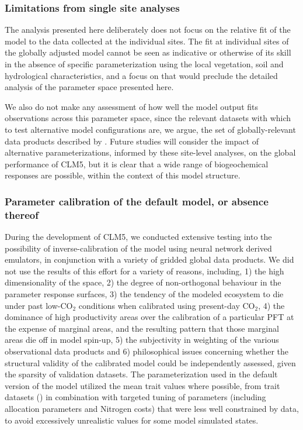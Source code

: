 \documentclass[draft,linenumbers]{agujournal}
\begin{document}
\subsubsection{Limitations from single site analyses}
The analysis presented here deliberately does not focus on the relative fit of the model to the data collected at the individual sites. The fit at individual sites of the globally adjusted model cannot be seen as indicative or otherwise of its skill in the absence of specific parameterization using the local vegetation, soil and hydrological characteristics, and a focus on that would preclude the detailed analysis of the parameter space presented here.  

We also do not make any assessment of how well the model output fits observations across this parameter space, since the relevant datasets with which to test alternative model configurations are, we argue, the set of globally-relevant data products described by \cite{lawrence2018}. Future studies will consider the impact of alternative parameterizations, informed by these site-level analyses, on the global performance of CLM5, but it is clear that a wide range of biogeochemical responses are possible, within the context of this model structure.  

\subsubsection{Parameter calibration of the default model, or absence thereof}
During the development of CLM5, we conducted extensive testing into the possibility of inverse-calibration of the model using neural network derived emulators, in conjunction with a variety of gridded global data products. We did not use the results of this effort for a variety of reasons, including,  1) the high dimensionality of the space, 2) the degree of non-orthogonal behaviour in the parameter response surfaces,  3) the tendency of the modeled ecosystem to die under past low-CO$_{2}$ conditions when calibrated using present-day CO$_{2}$, 4) the dominance of high productivity areas over the calibration of a particular PFT at the expense of marginal areas, and the resulting pattern that those marginal areas die off in model spin-up, 5) the subjectivity in weighting of the various observational data products and 6) philosophical issues concerning whether the structural validity of the calibrated model could be independently assessed, given the sparsity of validation datasets. The parameterization used in the default version of the model utilized the mean trait values where possible, from trait datasets (\cite{lawrence2018}) in combination with targeted tuning of parameters   (including allocation parameters and Nitrogen costs) that were less well constrained by data, to avoid excessively unrealistic values for some model simulated states.
\end{document}
